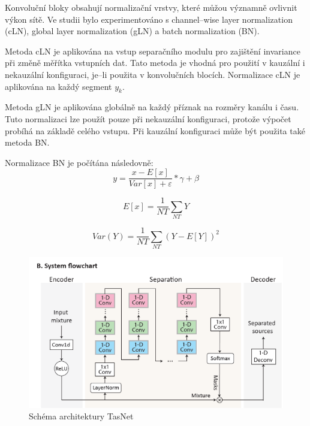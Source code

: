 Konvoluční bloky obsahují normalizační vrstvy, které můžou významně ovlivnit výkon sítě. Ve studii bylo experimentováno s channel--wise layer normalization (cLN), global layer normalization (gLN) a batch normalization (BN)\cite{ioffe2015batch}.

Metoda cLN je aplikována na vstup separačního modulu pro zajištění invariance při změně měřítka vstupních dat. Tato metoda je vhodná pro použití v kauzální i nekauzální konfiguraci, je--li použita v konvolučních blocích. Normalizace cLN je aplikována na každý segment $y_k$. 

Metoda gLN je aplikována globálně na každý příznak na rozměry kanálu i času. Tuto normalizaci lze použít pouze při nekauzální konfiguraci, protože výpočet probíhá na základě celého vstupu.
Při kauzální konfiguraci může být použita také metoda BN.

Normalizace BN je počítána následovně:
\begin{equation}
	y = \frac{x - E[x]}{Var[x] + \varepsilon} * \gamma + \beta
\end{equation}

\begin{equation}
	E[x] = \frac{1}{NT} \sum_{NT}Y
\end{equation}

\begin{equation}
	Var(Y) = \frac{1}{NT} \sum_{NT}(Y - E[Y])^2
\end{equation}


\bigskip

\begin{figure}[H]
    \centering
    \includegraphics[scale=0.7]{obrazky-figures/tasnet-architecture.png}
    \caption{\label{fig:tasnet-modul}Schéma architektury TasNet}
\end{figure}


